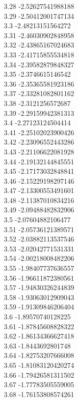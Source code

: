 {3.28	-2.52627541988188\\
3.29	-2.50412001747134\\
3.3	-2.48213151564272\\
3.31	-2.46030902848958\\
3.32	-2.43865167024683\\
3.33	-2.41715855534818\\
3.34	-2.39582879848327\\
3.35	-2.3746615146542\\
3.36	-2.35365581923186\\
3.37	-2.33281082801162\\
3.38	-2.3121256572687\\
3.39	-2.29159942381313\\
3.4	-2.27123124504414\\
3.41	-2.25102023900426\\
3.42	-2.23096552443286\\
3.43	-2.21106622081928\\
3.44	-2.19132144845551\\
3.45	-2.17173032848841\\
3.46	-2.15229198297146\\
3.47	-2.13300553491601\\
3.48	-2.11387010834216\\
3.49	-2.09488482832906\\
3.5	-2.07604882106477\\
3.51	-2.05736121389571\\
3.52	-2.03882113537546\\
3.53	-2.02042771531331\\
3.54	-2.00218008482206\\
3.55	-1.98407737636557\\
3.56	-1.96611872380561\\
3.57	-1.94830326244839\\
3.58	-1.93063012909043\\
3.59	-1.91309846206404\\
3.6	-1.89570740128225\\
3.61	-1.87845608828322\\
3.62	-1.86134366627418\\
3.63	-1.8443692801748\\
3.64	-1.82753207666008\\
3.65	-1.81083120420274\\
3.66	-1.79426581311502\\
3.67	-1.77783505559005\\
3.68	-1.76153808574261\\
}

